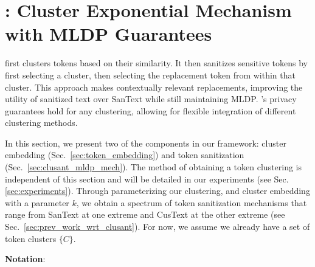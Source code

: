 
\section{\clusant: Cluster Exponential Mechanism with MLDP Guarantees}

\clusant first clusters tokens based on their similarity. It then sanitizes sensitive tokens by first selecting a cluster, then selecting the replacement token from within that cluster. This approach makes contextually relevant replacements, improving the utility of sanitized text over SanText while still maintaining MLDP. \clusant's privacy guarantees hold for any clustering, allowing for flexible integration of different clustering methods.

In this section, we present two of the components in our \clusant framework: cluster embedding (Sec.~\ref{sec:token_embedding}) and token sanitization (Sec.~\ref{sec:clusant_mldp_mech}). The method of obtaining a token clustering  is independent of this section and will be detailed in our experiments (see Sec. \ref{sec:experiments}). 
Through parameterizing our clustering, and cluster embedding with a parameter $k$, we obtain a spectrum of token sanitization mechanisms that range from SanText at one extreme and CusText at the other extreme 
(see Sec.~\ref{sec:prev_work_wrt_clusant}).
For now, we assume we already have a set of token clusters $\{C\}$. 

\vspace{0.5em}

\noindent
\textbf{Notation}:

